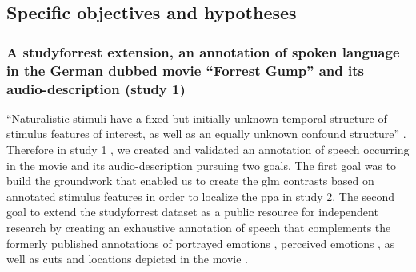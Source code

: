 \subsection{Specific objectives and hypotheses}







\subsubsection{A studyforrest extension, an annotation of spoken
language in the German dubbed movie ``Forrest Gump'' and its audio-description
(study 1)}






``Naturalistic stimuli have a fixed but initially unknown temporal structure of
stimulus features of interest, as well as an equally unknown confound
structure'' \citep{haeusler2021speechanno}.
Therefore in study 1 \citep{haeusler2021speechanno}, we created and validated an
annotation of speech occurring in the movie and its audio-description pursuing
two goals.
The first goal was to build the groundwork that enabled us to create the
\ac{glm} contrasts based on annotated stimulus features in order to localize the
\ac{ppa} in study 2.
The second goal to extend the studyforrest dataset as a public resource for
independent research by creating an exhaustive annotation of speech that
complements the formerly published annotations of portrayed emotions
\citep{labs2015portrayed}, perceived emotions \citep{lettieri2019emotionotopy},
as well as cuts and locations depicted in the movie \citep{haeusler2016cutanno}.

